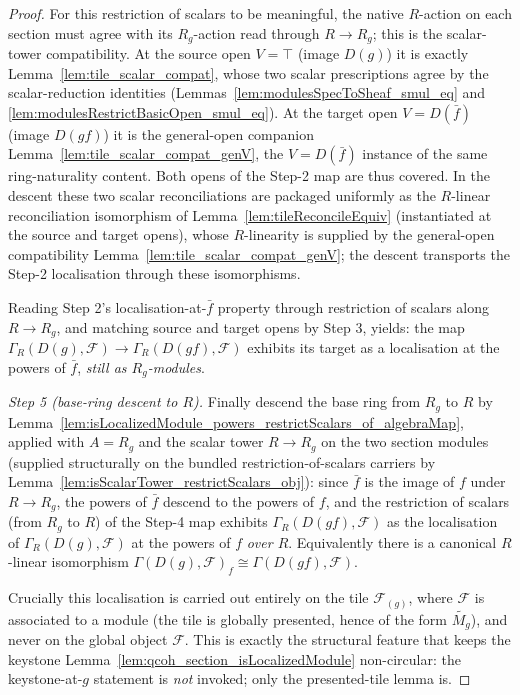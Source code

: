 \begin{proof}
  For this restriction of scalars to be meaningful, the native \(R\)-action on each section must agree
  with its \(R_g\)-action read through \(R \to R_g\); this is the scalar-tower compatibility. At the
  source open \(V = \top\) (image \(D(g)\)) it is exactly Lemma~\ref{lem:tile_scalar_compat}, whose two
  scalar prescriptions agree by the scalar-reduction identities
  (Lemmas~\ref{lem:modulesSpecToSheaf_smul_eq} and \ref{lem:modulesRestrictBasicOpen_smul_eq}). At the
  target open \(V = D(\bar f)\) (image \(D(gf)\)) it is the general-open companion
  Lemma~\ref{lem:tile_scalar_compat_genV}, the \(V = D(\bar f)\) instance of the same ring-naturality
  content. Both opens of the Step-2 map are thus covered. In the descent these two scalar
  reconciliations are packaged uniformly as the \(R\)-linear reconciliation isomorphism of
  Lemma~\ref{lem:tileReconcileEquiv} (instantiated at the source and target opens), whose
  \(R\)-linearity is supplied by the general-open compatibility Lemma~\ref{lem:tile_scalar_compat_genV};
  the descent transports the Step-2 localisation through these isomorphisms.

  Reading Step 2's localisation-at-\(\bar f\) property through restriction of scalars along
  \(R \to R_g\), and matching source and target opens by Step 3, yields: the map
  \(\Gamma_R(D(g), \mathcal{F}) \to \Gamma_R(D(gf), \mathcal{F})\) exhibits its target as a localisation
  at the powers of \(\bar f\), \emph{still as \(R_g\)-modules}.

  \emph{Step 5 (base-ring descent to \(R\)).} Finally descend the base ring from \(R_g\) to \(R\) by
  Lemma~\ref{lem:isLocalizedModule_powers_restrictScalars_of_algebraMap}, applied with \(A = R_g\) and the
  scalar tower \(R \to R_g\) on the two section modules (supplied structurally on the bundled
  restriction-of-scalars carriers by Lemma~\ref{lem:isScalarTower_restrictScalars_obj}): since \(\bar f\) is the image of \(f\) under
  \(R \to R_g\), the powers of \(\bar f\) descend to the powers of \(f\), and the restriction of scalars
  (from \(R_g\) to \(R\)) of the Step-4 map exhibits \(\Gamma_R(D(gf), \mathcal{F})\) as the localisation
  of \(\Gamma_R(D(g), \mathcal{F})\) at the powers of \(f\) \emph{over \(R\)}. Equivalently there is a
  canonical \(R\)-linear isomorphism \(\Gamma(D(g), \mathcal{F})_f \cong \Gamma(D(gf), \mathcal{F})\).

  Crucially this localisation is carried out entirely on the tile \(\mathcal{F}_{(g)}\), where
  \(\mathcal{F}\) is associated to a module (the tile is globally presented, hence of the form
  \(\widetilde{M_g}\)), and never on
  the global object \(\mathcal{F}\). This is exactly the structural feature that keeps the keystone
  Lemma~\ref{lem:qcoh_section_isLocalizedModule} non-circular: the keystone-at-\(g\) statement is
  \emph{not} invoked; only the presented-tile lemma is.
\end{proof}

